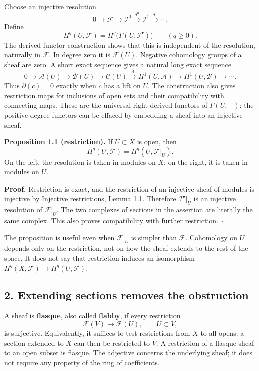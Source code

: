 \documentclass[11pt]{article}
\begin{document}
Choose an injective resolution \[
0\longrightarrow\mathcal F\longrightarrow\mathcal I^0
\xrightarrow{d^0}\mathcal I^1\xrightarrow{d^1}\cdots.
\] Define \[
H^q(U,\mathcal F)
=H^q\bigl(\Gamma(U,\mathcal I^\bullet)\bigr)
\qquad(q\geq0).
\] The derived-functor construction shows that this is independent of
the resolution, naturally in \(\mathcal F\). In degree zero it is
\(\mathcal F(U)\). Negative cohomology groups of a sheaf are zero. A
short exact sequence gives a natural long exact sequence \[
0\to\mathcal A(U)\to\mathcal B(U)\to\mathcal C(U)
\xrightarrow{\partial}H^1(U,\mathcal A)
\to H^1(U,\mathcal B)\to\cdots.
\] Thus \(\partial(c)=0\) exactly when \(c\) has a lift on \(U\). The
construction also gives restriction maps for inclusions of open sets and
their compatibility with connecting maps. These are the universal right
derived functors of \(\Gamma(U,-)\): the positive-degree functors can be
effaced by embedding a sheaf into an injective sheaf.

\textbf{Proposition 1.1 (restriction).} If \(U\subset X\) is open, then
\[
H^q(U,\mathcal F)=H^q(U,\mathcal F|_U).
\] On the left, the resolution is taken in modules on \(X\); on the
right, it is taken in modules on \(U\).

\textbf{Proof.} Restriction is exact, and the restriction of an
injective sheaf of modules is injective by
\href{https://kokunoyumeto.github.io/open-math-courses/courses/derived-categories-and-sheaf-operations/injective-modules-and-bounded-below-derived-functors.html\#1-extending-maps-and-extending-sections}{Injective
restrictions, Lemma 1.1}. Therefore \(\mathcal I^\bullet|_U\) is an
injective resolution of \(\mathcal F|_U\). The two complexes of sections
in the assertion are literally the same complex. This also proves
compatibility with further restriction. \(\square\)

The proposition is useful even when \(\mathcal F|_U\) is simpler than
\(\mathcal F\). Cohomology on \(U\) depends only on the restriction, not
on how the sheaf extends to the rest of the space. It does not say that
restriction induces an isomorphism
\(H^q(X,\mathcal F)\to H^q(U,\mathcal F)\).

\subsection{2. Extending sections removes the
obstruction}\label{extending-sections-removes-the-obstruction}

A sheaf is \textbf{flasque}, also called \textbf{flabby}, if every
restriction \[
\mathcal F(V)\longrightarrow\mathcal F(U),\qquad U\subset V,
\] is surjective. Equivalently, it suffices to test restrictions from
\(X\) to all opens: a section extended to \(X\) can then be restricted
to \(V\). A restriction of a flasque sheaf to an open subset is flasque.
The adjective concerns the underlying sheaf; it does not require any
property of the ring of coefficients.
\end{document}
